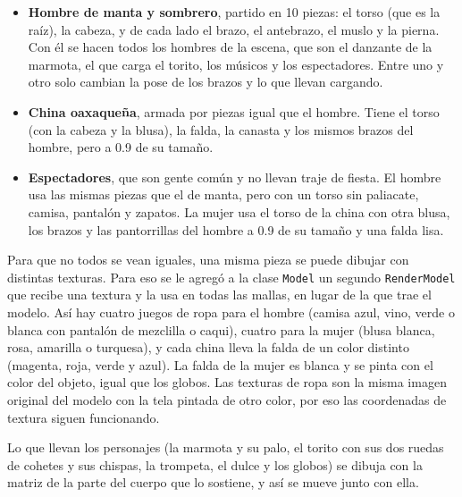 \documentclass[11pt,a4paper]{article}
\begin{document}
\begin{itemize}
  \item \textbf{Hombre de manta y sombrero}, partido en 10 piezas: el torso (que es la raíz), la cabeza, y de cada lado el brazo, el antebrazo, el muslo y la pierna. Con él se hacen todos los hombres de la escena, que son el danzante de la marmota, el que carga el torito, los músicos y los espectadores. Entre uno y otro solo cambian la pose de los brazos y lo que llevan cargando.
  \item \textbf{China oaxaqueña}, armada por piezas igual que el hombre. Tiene el torso (con la cabeza y la blusa), la falda, la canasta y los mismos brazos del hombre, pero a 0.9 de su tamaño.
  \item \textbf{Espectadores}, que son gente común y no llevan traje de fiesta. El hombre usa las mismas piezas que el de manta, pero con un torso sin paliacate, camisa, pantalón y zapatos. La mujer usa el torso de la china con otra blusa, los brazos y las pantorrillas del hombre a 0.9 de su tamaño y una falda lisa.
\end{itemize}

Para que no todos se vean iguales, una misma pieza se puede dibujar con distintas texturas. Para eso se le agregó a la clase \texttt{Model} un segundo \texttt{RenderModel} que recibe una textura y la usa en todas las mallas, en lugar de la que trae el modelo. Así hay cuatro juegos de ropa para el hombre (camisa azul, vino, verde o blanca con pantalón de mezclilla o caqui), cuatro para la mujer (blusa blanca, rosa, amarilla o turquesa), y cada china lleva la falda de un color distinto (magenta, roja, verde y azul). La falda de la mujer es blanca y se pinta con el color del objeto, igual que los globos. Las texturas de ropa son la misma imagen original del modelo con la tela pintada de otro color, por eso las coordenadas de textura siguen funcionando.

Lo que llevan los personajes (la marmota y su palo, el torito con sus dos ruedas de cohetes y sus chispas, la trompeta, el dulce y los globos) se dibuja con la matriz de la parte del cuerpo que lo sostiene, y así se mueve junto con ella.
\end{document}
